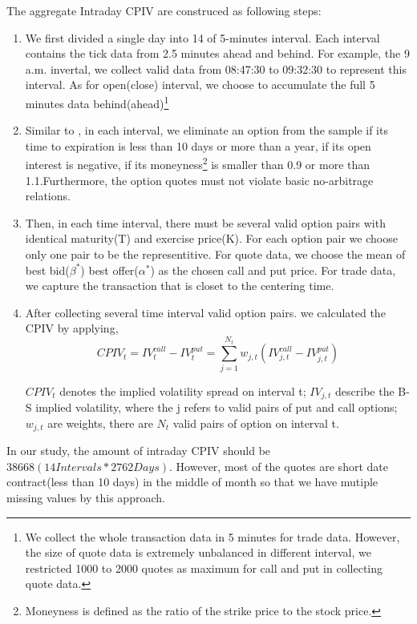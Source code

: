 The aggregate Intraday CPIV are construced as following steps: 
\begin{enumerate}
\item  We first divided a single day into 14 of 5-minutes interval. Each interval contains the tick data from 2.5 minutes ahead and behind. For example, the 9 a.m. invertal, we collect valid data from 08:47:30 to 09:32:30 to represent this interval. As for open(close) interval, we choose to accumulate the full 5 minutes data behind(ahead)\footnote{We collect the whole transaction data in 5 minutes for trade data. However, the size of quote data is extremely unbalanced in different interval, we restricted 1000 to 2000 quotes as maximum for call and put in collecting quote data.}

\item Similar to \cite{xing2010does}, in each interval, we eliminate an option from the sample if its time to expiration is less than 10 days or more than a year, if its open interest is negative, if its moneyness\footnote{Moneyness is defined as the ratio of the strike price to the stock price.} is smaller than 0.9 or more than 1.1.Furthermore, the option quotes must not violate basic no-arbitrage relations.

\item Then, in each time interval, there must be several valid option pairs with identical maturity(T) and exercise price(K). For each option pair we choose only one pair to be the representitive. For quote data, we choose the mean of best bid($\beta ^{\ast }$) best offer($\alpha ^{\ast }$) as the chosen call and put price. For trade data, we capture the transaction that is closet to the centering time.  

\item After collecting several time interval valid option pairs. we calculated the CPIV by applying, 
 \begin{equation}
CPIV_{t} = IV_{t}^{call} - IV_{t}^{put} = \sum_{j = 1}^{N_{t}}w_{j,t}(IV_{j,t}^{call} - IV_{j,t}^{put})
 \end{equation}
 
$CPIV_{t}$ denotes the implied volatility spread on interval t; $IV_{j,t}$ describe the B-S implied volatility, where the j refers to valid pairs of put and call options; $w_{j,t}$ are weights, there are $N_{t}$ valid pairs of option on interval t. 

\end{enumerate}

In our study, the amount of intraday CPIV should be $38668 (14 Intervals * 2762 Days)$. However, most of the quotes are short date contract(less than 10 days) in the middle of month so that we have mutiple missing values by this approach.







